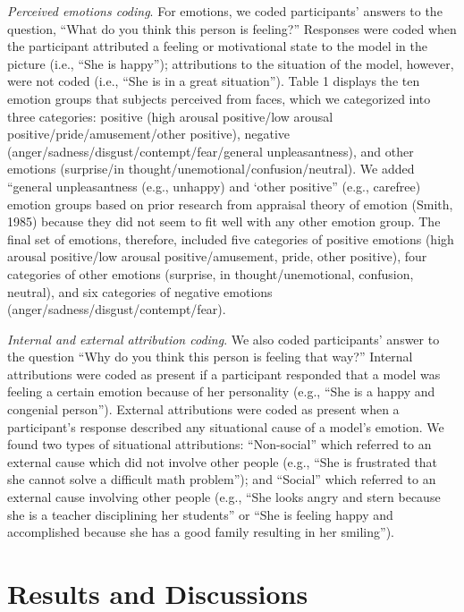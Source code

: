 \documentclass[english,man]{apa6}
\begin{document}
\emph{Perceived emotions coding}. For emotions, we coded participants'
answers to the question, \enquote{What do you think this person is
feeling?} Responses were coded when the participant attributed a feeling
or motivational state to the model in the picture (i.e., \enquote{She is
happy}); attributions to the situation of the model, however, were not
coded (i.e., \enquote{She is in a great situation}). Table 1 displays
the ten emotion groups that subjects perceived from faces, which we
categorized into three categories: positive (high arousal positive/low
arousal positive/pride/amusement/other positive), negative
(anger/sadness/disgust/contempt/fear/general unpleasantness), and other
emotions (surprise/in thought/unemotional/confusion/neutral). We added
\enquote{general unpleasantness (e.g., unhappy) and `other positive}
(e.g., carefree) emotion groups based on prior research from appraisal
theory of emotion (Smith, 1985) because they did not seem to fit well
with any other emotion group. The final set of emotions, therefore,
included five categories of positive emotions (high arousal positive/low
arousal positive/amusement, pride, other positive), four categories of
other emotions (surprise, in thought/unemotional, confusion, neutral),
and six categories of negative emotions
(anger/sadness/disgust/contempt/fear).

\emph{Internal and external attribution coding}. We also coded
participants' answer to the question \enquote{Why do you think this
person is feeling that way?} Internal attributions were coded as present
if a participant responded that a model was feeling a certain emotion
because of her personality (e.g., \enquote{She is a happy and congenial
person}). External attributions were coded as present when a
participant's response described any situational cause of a model's
emotion. We found two types of situational attributions:
\enquote{Non-social} which referred to an external cause which did not
involve other people (e.g., \enquote{She is frustrated that she cannot
solve a difficult math problem}); and \enquote{Social} which referred to
an external cause involving other people (e.g., \enquote{She looks angry
and stern because she is a teacher disciplining her students} or
\enquote{She is feeling happy and accomplished because she has a good
family resulting in her smiling}).

\section{Results and Discussions}\label{results-and-discussions-2}
\end{document}
